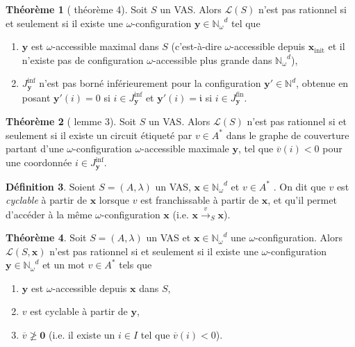 \documentclass[a4paper,final]{article}
\theoremstyle{definition}
\newtheorem{Theorem}{Théorème}
\newtheorem{Definition}[Theorem]{Définition}
\let\geq\geqslant
\newcommand{\set}[2]{\left\{#1\mathrel{\left|\vphantom{#1}\vphantom{#2}\right.}#2\right\}}
\newcommand{\N}{\ensuremath{\mathbb{N}}}
\newcommand{\Nomega}{\ensuremath{\mathbb{N}_\omega}}
\newcommand{\lang}{\ensuremath{\mathcal{L}}}
\newcommand{\trans}[2]{\ensuremath{\stackrel{#1}{\longrightarrow}_{#2}}}
\newcommand{\vect}[1]{\ensuremath{\mathbf{#1}}}
\newcommand{\xinit}{\ensuremath{\vect{x}_\text{init}}}
\newcommand{\valeur}[1]{\ensuremath{\overline{#1}}}
\newcommand{\Jfin}[1]{J^\text{fin}_{#1}}
\newcommand{\Jinf}[1]{J^\text{inf}_{#1}}
\begin{document}
\begin{Theorem}[\cite{vavn81} théorème 4]
Soit $S$ un VAS.
Alors $\lang(S)$ n'est pas rationnel si et seulement si
il existe une $\omega$-configuration $\vect{y} \in \Nomega^d$ tel que
\begin{enumerate}
    \item $\vect{y}$ est $\omega$-accessible maximal dans $S$ (c'est-à-dire $\omega$-accessible depuis $\xinit$ et il n'existe pas de configuration $\omega$-accessible plus grande dans $\Nomega^d$),
    \item $\Jinf{\vect{y}}$ n'est pas borné inférieurement pour la configuration $\vect{y'}\in\N^d$, 
    obtenue en posant $\vect{y'}(i) = 0$ si $i\in \Jinf{\vect{y}}$ et $\vect{y'}(i) = \mathfrak{i}$ si $i\in \Jfin{\vect{y}}$.
\end{enumerate}
\end{Theorem}

\begin{Theorem}[\cite{vavn81} lemme 3]
Soit $S$ un VAS.
Alors $\lang(S)$ n'est pas rationnel si et seulement si
il existe un circuit étiqueté par $v\in A^*$ dans le graphe de couverture partant d'une $\omega$-configuration $\omega$-accessible maximale $\vect{y}$, 
tel que $\valeur{v}(i) < 0$ pour une coordonnée $i\in \Jinf{\vect{y}}$.
\end{Theorem}


\begin{Definition}
Soient $S = (A,\lambda)$ un VAS, $\vect{x}\in\Nomega^d$  et $v\in A^*$ .
On dit que $v$ est \emph{cyclable} à partir de $\vect{x}$ lorsque $v$ est franchissable à partir de $\vect{x}$, et qu'il permet d'accéder à la même $\omega$-configuration $\vect{x}$ (i.e. $\vect{x} \trans{v}{S} \vect{x}$).
\end{Definition}

\begin{Theorem}
Soit $S = (A,\lambda)$ un VAS et $\vect{x}\in\Nomega^d$ une $\omega$-configuration.
Alors $\lang(S,\vect{x})$ n'est pas rationnel si et seulement si
il existe une $\omega$-configuration $\vect{y}\in\Nomega^d$ et un mot $v\in A^*$ tels que
\begin{enumerate}
    \item $\vect{y}$ est $\omega$-accessible depuis $\vect{x}$ dans $S$,
    \item $v$ est cyclable à partir de $\vect{y}$,
    \item $\valeur{v} \not\geq \vect{0}$ (i.e. il existe un $i\in I$ tel que $\valeur{v}(i)<0$).
\end{enumerate}
\end{Theorem}
\end{document}
